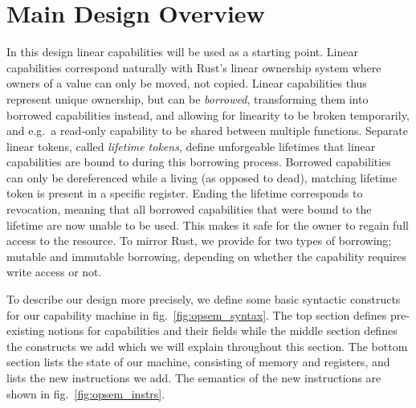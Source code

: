 \section{Main Design Overview}
\label{sec:maindesign}
In this design linear capabilities will be used as a starting point.
Linear capabilities correspond naturally with Rust's linear ownership system where owners of a value can only be moved, not copied.
Linear capabilities thus represent unique ownership, but can be \emph{borrowed}, transforming them into borrowed capabilities instead, and allowing for linearity to be broken temporarily, and e.g.\ a read-only capability to be shared between multiple functions.
Separate linear tokens, called \emph{lifetime tokens}, define unforgeable lifetimes that linear capabilities are bound to during this borrowing process.
Borrowed capabilities can only be dereferenced while a living (as opposed to dead), matching lifetime token is present in a specific register.
Ending the lifetime corresponds to revocation, meaning that all borrowed capabilities that were bound to the lifetime are now unable to be used.
This makes it safe for the owner to regain full access to the resource.
To mirror Rust, we provide for two types of borrowing; mutable and immutable borrowing, depending on whether the capability requires write access or not.

To describe our design more precisely, we define some basic syntactic constructs for our capability machine in fig.\ \ref{fig:opsem_syntax}.
The top section defines pre-existing notions for capabilities and their fields while the middle section defines the constructs we add which we will explain throughout this section.
The bottom section lists the state of our machine, consisting of memory and registers, and lists the new instructions we add.
The semantics of the new instructions are shown in fig.\ \ref{fig:opsem_instrs}.

